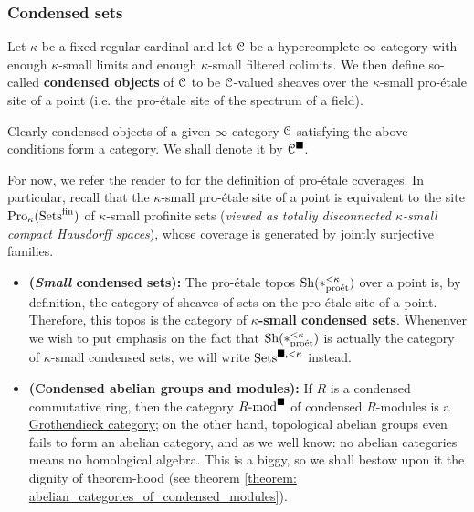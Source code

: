             \subsubsection{Condensed sets}
                \begin{definition}[Condensation] \label{def: condensation}
                    Let $\kappa$ be a fixed regular cardinal and let $\mathcal{C}$ be a hypercomplete $\infty$-category with enough $\kappa$-small limits and enough $\kappa$-small filtered colimits. We then define so-called \textbf{condensed objects} of $\mathcal{C}$ to be $\mathcal{C}$-valued sheaves over the $\kappa$-small pro-\'etale site of a point (i.e. the pro-\'etale site of the spectrum of a field). 
                    
                    Clearly condensed objects of a given $\infty$-category $\mathcal{C}$ satisfying the above conditions form a category. We shall denote it by $\mathcal{C}^{\blacksquare}$.
                \end{definition}
                \begin{remark}
                    For now, we refer the reader to \cite[Definition 4.1.1 and Remark 4.1.3]{bhatt_scholze_2014_pro_etale} for the definition of pro-\'etale coverages. In particular, recall that the $\kappa$-small pro-\'etale site of a point is equivalent to the site $\mathrm{Pro}_{\kappa}(\mathrm{Sets}^{\mathrm{fin}})$ of $\kappa$-small profinite sets (\textit{viewed as totally disconnected $\kappa$-small compact Hausdorff spaces}), whose coverage is generated by jointly surjective families. 
                \end{remark}
                \begin{example}
                    \noindent
                    \begin{itemize}
                        \item \textbf{(\textit{Small} condensed sets):} The pro-\'etale topos $\mathrm{Sh}(*_{\mathrm{pro\acute{e}t}}^{< \kappa})$ over a point is, by definition, the category of sheaves of sets on the pro-\'etale site of a point. Therefore, this topos is the category of \textbf{$\kappa$-small condensed sets}. Whenenver we wish to put emphasis on the fact that $\mathrm{Sh}(*_{\mathrm{pro\acute{e}t}}^{< \kappa})$ is actually the category of $\kappa$-small condensed sets, we will write $\mathrm{Sets}^{\blacksquare, < \kappa}$ instead.
                        \item \textbf{(Condensed abelian groups and modules):} If $R$ is a condensed commutative ring, then the category $R\text{-}\mathrm{mod}^{\blacksquare}$ of condensed $R$-modules is a \href{https://ncatlab.org/nlab/show/Grothendieck+category}{\underline{Grothendieck category}}; on the other hand, topological abelian groups even fails to form an abelian category, and as we well know: no abelian categories means no homological algebra. This is a biggy, so we shall bestow upon it the dignity of theorem-hood (see theorem \ref{theorem: abelian_categories_of_condensed_modules}).
                    \end{itemize}
                \end{example}
